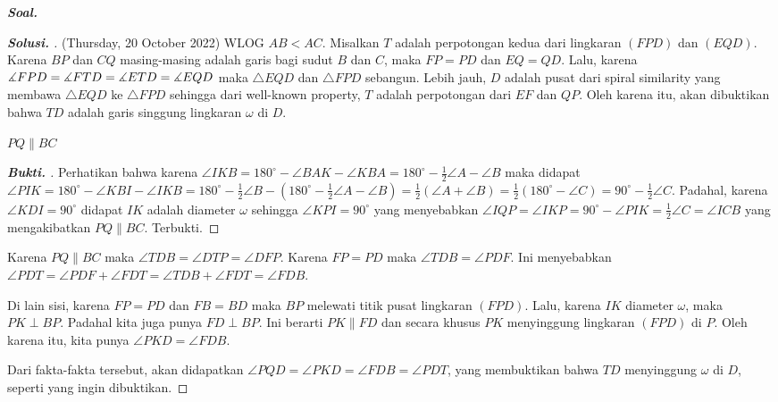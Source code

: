 \textbf{\textit{Soal. }}

\begin{proof}[\textbf{Solusi. }] (Thursday, 20 October 2022) WLOG $AB < AC$. Misalkan $T$ adalah perpotongan kedua dari lingkaran $(FPD)$ dan $(EQD)$. Karena $BP$ dan $CQ$ masing-masing adalah garis bagi sudut $B$ dan $C$, maka $FP=PD$ dan $EQ=QD$. Lalu, karena $\measuredangle FPD = \measuredangle FTD = \measuredangle ETD = \measuredangle EQD$ maka $\triangle EQD$ dan $\triangle FPD$ sebangun. Lebih jauh, $D$ adalah pusat dari spiral similarity yang membawa $\triangle EQD$ ke $\triangle FPD$ sehingga dari well-known property, $T$ adalah perpotongan dari $EF$ dan $QP$. Oleh karena itu, akan dibuktikan bahwa $TD$ adalah garis singgung lingkaran $\omega$ di $D$.

\begin{lemmarev}
    $PQ \parallel BC$
    \begin{proof}[\textbf{Bukti. }]
        Perhatikan bahwa karena $\angle IKB = 180^\circ - \angle BAK - \angle KBA = 180^\circ - \frac{1}{2}\angle A - \angle B$ maka didapat $\angle PIK = 180^\circ - \angle KBI - \angle IKB =  180^\circ - \frac{1}{2}\angle B - (180^\circ - \frac{1}{2}\angle A - \angle B)= \frac{1}{2}(\angle A + \angle B) = \frac{1}{2}(180^\circ - \angle C) = 90^\circ - \frac{1}{2}\angle C$. Padahal, karena $\angle KDI=90^\circ$ didapat $IK$ adalah diameter $\omega$ sehingga $\angle KPI = 90^\circ$ yang menyebabkan $\angle IQP = \angle IKP = 90^\circ - \angle PIK = \frac{1}{2}\angle C = \angle ICB$ yang mengakibatkan $PQ \parallel BC$. Terbukti.
    \end{proof}
\end{lemmarev}

% 


Karena $PQ \parallel BC$ maka $\angle TDB = \angle DTP = \angle DFP$. Karena $FP=PD$ maka $\angle TDB = \angle PDF$. Ini menyebabkan $\angle PDT = \angle PDF + \angle FDT = \angle TDB + \angle FDT = \angle FDB$.

Di lain sisi, karena $FP=PD$ dan $FB=BD$ maka $BP$ melewati titik pusat lingkaran $(FPD)$. Lalu, karena $IK$ diameter $\omega$, maka $PK \perp BP$. Padahal kita juga punya $FD \perp BP$. Ini berarti $PK \parallel FD$ dan secara khusus $PK$ menyinggung lingkaran $(FPD)$ di $P$. Oleh karena itu, kita punya $\angle PKD = \angle FDB$.

Dari fakta-fakta tersebut, akan didapatkan $\angle PQD = \angle PKD = \angle FDB = \angle PDT$, yang membuktikan bahwa $TD$ menyinggung $\omega$ di $D$, seperti yang ingin dibuktikan.

    
\end{proof}